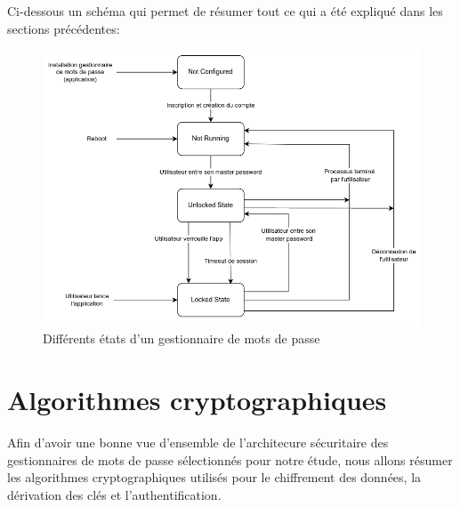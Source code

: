 Ci-dessous un schéma qui permet de résumer tout ce qui a été expliqué dans les sections précédentes:

\begin{figure}[H]
	\includegraphics[width=14.5cm]{images/states.png}
	\centering
	\caption{Différents états d'un gestionnaire de mots de passe}
\end{figure}

\section{Algorithmes cryptographiques}
Afin d'avoir une bonne vue d'ensemble de l'architecure sécuritaire des gestionnaires de mots de passe sélectionnés pour notre étude, nous allons résumer les algorithmes cryptographiques utilisés pour le chiffrement des données, la dérivation des clés et l'authentification.

